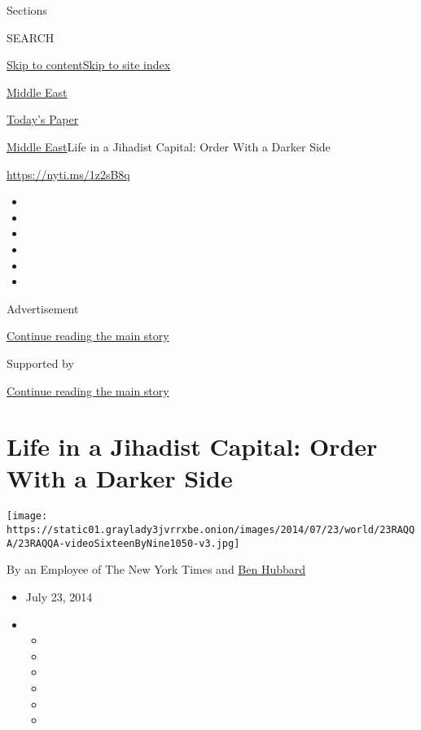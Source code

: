 Sections

SEARCH

\protect\hyperlink{site-content}{Skip to
content}\protect\hyperlink{site-index}{Skip to site index}

\href{https://www.nytimes3xbfgragh.onion/section/world/middleeast}{Middle
East}

\href{https://myaccount.nytimes3xbfgragh.onion/auth/login?response_type=cookie\&client_id=vi}{}

\href{https://www.nytimes3xbfgragh.onion/section/todayspaper}{Today's
Paper}

\href{/section/world/middleeast}{Middle East}\textbar{}Life in a
Jihadist Capital: Order With a Darker Side

\url{https://nyti.ms/1z2sB8q}

\begin{itemize}
\item
\item
\item
\item
\item
\item
\end{itemize}

Advertisement

\protect\hyperlink{after-top}{Continue reading the main story}

Supported by

\protect\hyperlink{after-sponsor}{Continue reading the main story}

\hypertarget{life-in-a-jihadist-capital-order-with-a-darker-side}{%
\section{Life in a Jihadist Capital: Order With a Darker
Side}\label{life-in-a-jihadist-capital-order-with-a-darker-side}}

\texttt{[image: https://static01.graylady3jvrrxbe.onion/images/2014/07/23/world/23RAQQA/23RAQQA-videoSixteenByNine1050-v3.jpg]}

By an Employee of The New York Times and
\href{http://www.nytimes3xbfgragh.onion/by/ben-hubbard}{Ben Hubbard}

\begin{itemize}
\item
  July 23, 2014
\item
  \begin{itemize}
  \item
  \item
  \item
  \item
  \item
  \item
  \end{itemize}
\end{itemize}

